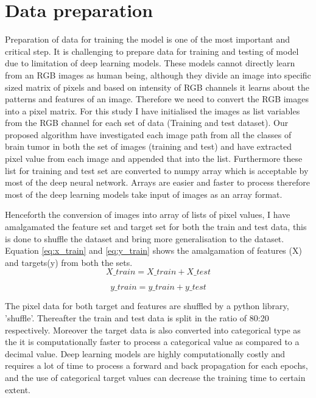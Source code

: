 \documentclass[12pt, a4paper,twoside]{report}
\theoremstyle{plain} %
\theoremstyle{definition} %
\theoremstyle{remark} %
\numberwithin{equation}{chapter}
\begin{document}
\section{Data preparation}\label{sec:3.3}
Preparation of data for training the model is one of the most important and critical step. It is challenging to prepare data for training and testing of model due to limitation of deep learning models. These models cannot directly learn from an RGB images as human being, although they divide an image into specific sized matrix of pixels and based on intensity of RGB channels it learns about the patterns and features of an image. Therefore we need to convert the RGB images into a pixel matrix. For this study I have initialised the images as list variables from the RGB channel for each set of data (Training and test dataset). Our proposed algorithm have investigated each image path from all the classes of brain tumor in both the set of images (training and test) and have extracted pixel value from each image and appended that into the list. Furthermore these list for training and test set are converted to numpy array which is acceptable by most of the deep neural network. Arrays are easier and faster to process therefore most of the deep learning models take input of images as an array format. 

Henceforth the conversion of images into array of lists of pixel values, I have amalgamated the feature set and target set for both the train and test data, this is done to shuffle the dataset and bring more generalisation to the dataset. Equation \ref{eq:x_train} and \ref{eq:y_train} shows the amalgamation of features (X) and targets(y) from both the sets. 
\begin{equation}
    X\_train = X\_train + X\_test
    \label{eq:x_train}
\end{equation}

\begin{equation}
    y\_train = y\_train + y\_test
    \label{eq:y_train}
\end{equation}

The pixel data for both target and features are shuffled by a python library, 'shuffle'. Thereafter the train and test data is split in the ratio of 80:20 respectively. Moreover the target data is also converted into categorical type as the it is computationally faster to process a categorical value as compared to a decimal value. Deep learning models are highly computationally costly and requires a lot of time to process a forward and back propagation for each epochs, and the use of categorical target values can decrease the training time to certain extent.
\end{document}
